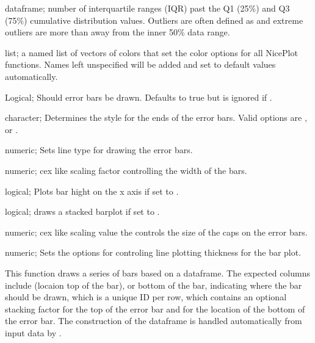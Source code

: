 \documentclass[a4paper]{book}
\begin{document}
\begin{Arguments}
\begin{ldescription}
\item[\code{x}] dataframe; number of interquartile ranges (IQR) past the Q1 (25\%) and Q3 (75\%) cumulative distribution values. Outliers are often defined as  and extreme outliers are more than  away from the inner 50\% data range.

\item[\code{plotColors}] list; a named list of vectors of colors that set the color options for all NicePlot functions. Names left unspecified will be added and set to default values automatically.

\item[\code{errorBars}] Logical; Should error bars be drawn. Defaults to true but is ignored if .

\item[\code{errorCap}] character; Determines the style for the ends of the error bars. Valid options are ,  or .

\item[\code{errorLineType}] numeric; Sets  line type for drawing the error bars.

\item[\code{width}] numeric; cex like scaling factor controlling the width of the bars.

\item[\code{sidePlot}] logical; Plots bar hight on the x axis if set to .

\item[\code{stacked}] logical; draws a stacked barplot if set to .

\item[\code{capSize}] numeric; cex like scaling value the controls the size of the caps on the error bars.

\item[\code{lineWidth}] numeric; Sets the  options for controling line plotting thickness for the bar plot.
\end{ldescription}
\end{Arguments}
%
\begin{Details}\relax
This function draws a series of bars based on a dataframe. The expected columns include  (locaion top of the bar),
 or bottom of the bar,  indicating where the bar should be drawn,  which is a unique ID per row,  which contains an optional stacking factor
 for the top of the error bar and  for the location of the bottom of the error bar. The construction of the dataframe is handled automatically from input data
by .
\end{Details}
\end{document}
